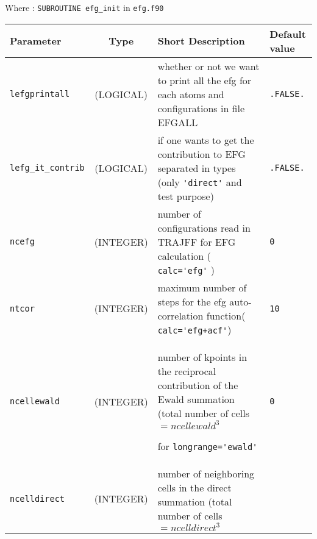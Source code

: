 \documentclass[a4paper]{article}
\begin{document}
Where : \verb?SUBROUTINE efg_init? in \verb?efg.f90?
\newline

\begin{longtable}{l|c|m{8cm}|m{2cm}}
\hline
\hline
Parameter              &  Type              &          Short Description                                                          & Default value \\
\hline
\hline
\rule[-0.75cm]{0cm}{1.5cm}
\verb?lefgprintall?    & (LOGICAL)          &  whether or not we want to print all the efg for each atoms and 
                                               configurations in file EFGALL                                                      & \verb?.FALSE.? \\
\hline
\rule[-0.75cm]{0cm}{1.5cm}
\verb?lefg_it_contrib? & (LOGICAL)          & if one wants to get the contribution to EFG separated in types 
                                              (only \verb?'direct'? and test purpose)                                             & \verb?.FALSE.? \\
\hline
\rule[-0.75cm]{0cm}{1.5cm}
\verb?ncefg?           & (INTEGER)          & number of configurations read in TRAJFF for EFG calculation ( \verb?calc='efg'? )    & \verb?0? \\
\hline
\rule[-0.75cm]{0cm}{1.5cm}
\verb?ntcor?           & (INTEGER)          & maximum number of steps for the efg auto-correlation function( \verb?calc='efg+acf'?)& \verb?10? \\
\hline
\rule[-0.75cm]{0cm}{1.5cm}
\verb?ncellewald?      & (INTEGER)          & \newline number of kpoints in the reciprocal contribution of the Ewald summation
                                              (total number of cells $=ncellewald^3$ \newline
					 
                                              for \verb?longrange='ewald'?  \newline                                               & \verb?0? \\
\hline
\rule[-0.75cm]{0cm}{1.5cm}
\verb?ncelldirect?     & (INTEGER)          & \newline number of neighboring cells in the direct summation
                                              (total number of cells $=ncelldirect^3$ \newline
					 

\end{longtable}
\end{document}

